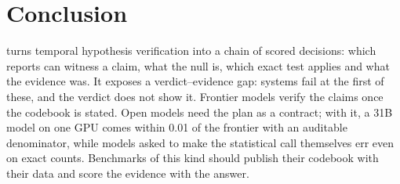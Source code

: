 \section{Conclusion}
\label{sec:limitations}
\label{sec:conclusion}

\sys{} turns temporal hypothesis verification into a chain of scored
decisions: which reports can witness a claim, what the null is, which exact
test applies and what the evidence was. It exposes a verdict--evidence gap:
systems fail at the first of these, and the verdict does not show it. Frontier models verify the claims once the
codebook is stated. Open models need the plan as a contract; with it, a 31B
model on one GPU comes within 0.01 of the frontier with an auditable
denominator, while models asked to make the statistical call themselves err
even on exact counts. Benchmarks of this kind should publish their codebook
with their data and score the evidence with the answer.

